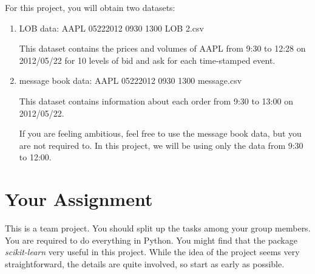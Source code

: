 \documentclass[11pt, oneside]{article}   	%
\begin{document}
For this project, you will obtain two datasets: 
\begin{enumerate}
\item LOB data: AAPL 05222012 0930 1300 LOB 2.csv

This dataset contains the prices and volumes of AAPL from 9:30 to 12:28 on 2012/05/22 for 10 levels of bid and ask for each time-stamped event.

\item message book data: AAPL 05222012 0930 1300 message.csv

This dataset contains information about each order from 9:30 to 13:00 on 2012/05/22.

If you are feeling ambitious, feel free to use the message book data, but you are not required to. In this project, we will be using only the data from 9:30 to 12:00.

\end{enumerate}

\section{Your Assignment}

This is a team project. You should split up the tasks among your group members. You are required to do everything in Python. You might find that the package \textit{scikit-learn} very useful in this project. While the idea of the project seems very straightforward, the details are quite involved, so start as early as possible.
\end{document}
